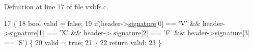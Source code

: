 Definition at line 17 of file vxbfs.\+c.


\begin{DoxyCode}
17                                         \{
18     \textcolor{keywordtype}{bool} valid = \textcolor{keyword}{false};
19     \textcolor{keywordflow}{if}(header->\hyperlink{a00340_a4c82fb69a08f04d22d832e030cc71577_a4c82fb69a08f04d22d832e030cc71577}{signature}[0] == \textcolor{charliteral}{'V'} && header->\hyperlink{a00340_a4c82fb69a08f04d22d832e030cc71577_a4c82fb69a08f04d22d832e030cc71577}{signature}[1] == \textcolor{charliteral}{'X'} && header->
      \hyperlink{a00340_a4c82fb69a08f04d22d832e030cc71577_a4c82fb69a08f04d22d832e030cc71577}{signature}[2] == \textcolor{charliteral}{'F'} && header->\hyperlink{a00340_a4c82fb69a08f04d22d832e030cc71577_a4c82fb69a08f04d22d832e030cc71577}{signature}[3] == \textcolor{charliteral}{'S'}) \{
20         valid = \textcolor{keyword}{true};
21     \}
22     \textcolor{keywordflow}{return} valid;
23 \}
\end{DoxyCode}
